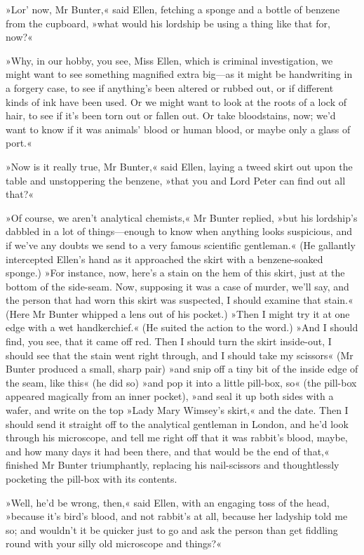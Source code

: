 »Lor' now, Mr Bunter,« said Ellen, fetching a sponge and a bottle of benzene from the cupboard, »what would his lordship be using a thing like that for, now?«

»Why, in our hobby, you see, Miss Ellen, which is criminal investigation, we might want to see something magnified extra big—as it might be handwriting in a forgery case, to see if anything's been altered or rubbed out, or if different kinds of ink have been used. Or we might want to look at the roots of a lock of hair, to see if it's been torn out or fallen out. Or take bloodstains, now; we'd want to know if it was animals' blood or human blood, or maybe only a glass of port.«

»Now is it really true, Mr Bunter,« said Ellen, laying a tweed skirt out upon the table and unstoppering the benzene, »that you and Lord Peter can find out all that?«

»Of course, we aren't analytical chemists,« Mr Bunter replied, »but his lordship's dabbled in a lot of things—enough to know when anything looks suspicious, and if we've any doubts we send to a very famous scientific gentleman.« (He gallantly intercepted Ellen's hand as it approached the skirt with a benzene-soaked sponge.) »For instance, now, here's a stain on the hem of this skirt, just at the bottom of the side-seam. Now, supposing it was a case of murder, we'll say, and the person that had worn this skirt was suspected, I should examine that stain.« (Here Mr Bunter whipped a lens out of his pocket.) »Then I might try it at one edge with a wet handkerchief.« (He suited the action to the word.) »And I should find, you see, that it came off red.  Then I should turn the skirt inside-out, I should see that the stain went right through, and I should take my scissors« (Mr Bunter produced a small, sharp pair) »and snip off a tiny bit of the inside edge of the seam, like this« (he did so) »and pop it into a little pill-box, so« (the pill-box appeared magically from an inner pocket), »and seal it up both sides with a wafer, and write on the top »Lady Mary Wimsey's skirt,« and the date. Then I should send it straight off to the analytical gentleman in London, and he'd look through his microscope, and tell me right off that it was rabbit's blood, maybe, and how many days it had been there, and that would be the end of that,« finished Mr Bunter triumphantly, replacing his nail-scissors and thoughtlessly pocketing the pill-box with its contents.

»Well, he'd be wrong, then,« said Ellen, with an engaging toss of the head, »because it's bird's blood, and not rabbit's at all, because her ladyship told me so; and wouldn't it be quicker just to go and ask the person than get fiddling round with your silly old microscope and things?«

